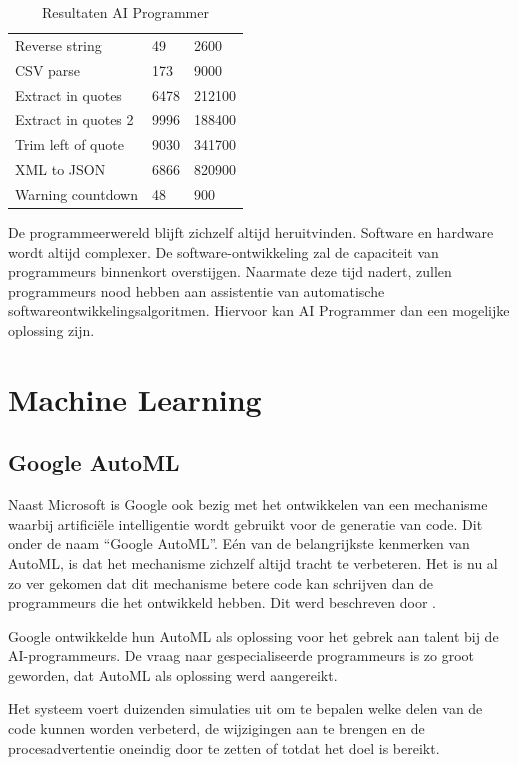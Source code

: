 \begin{table}[htb]
\begin{tabular}{lll}
		Reverse string              & 49       & 2600       \\
		CSV parse                   & 173      & 9000       \\
		Extract in quotes           & 6478     & 212100     \\
		Extract in quotes 2         & 9996     & 188400     \\
		Trim left of quote          & 9030     & 341700     \\
		XML to JSON                 & 6866     & 820900     \\
		Warning countdown           & 48       & 900       
	\end{tabular}
	\caption{Resultaten AI Programmer}
	\label{table:aiprog}
\end{table}

De programmeerwereld blijft zichzelf altijd heruitvinden. Software en hardware wordt altijd complexer. De software-ontwikkeling zal de capaciteit van programmeurs binnenkort overstijgen. Naarmate deze tijd nadert, zullen programmeurs nood hebben aan assistentie van automatische softwareontwikkelingsalgoritmen. Hiervoor kan AI Programmer dan een mogelijke oplossing zijn.

\section{Machine Learning}

\subsection{Google AutoML}

Naast Microsoft is Google ook bezig met het ontwikkelen van een mechanisme waarbij artificiële intelligentie wordt gebruikt voor de generatie van code. Dit onder de naam “Google AutoML”. Eén van de belangrijkste kenmerken van AutoML, is dat het mechanisme zichzelf altijd tracht te verbeteren. Het is nu al zo ver gekomen dat dit mechanisme betere code kan schrijven dan de programmeurs die het ontwikkeld hebben. Dit werd beschreven door \textcite{greene}.

Google ontwikkelde hun AutoML als oplossing voor het gebrek aan talent bij de AI-programmeurs. De vraag naar gespecialiseerde programmeurs is zo groot geworden, dat AutoML als oplossing werd aangereikt. 

Het systeem voert duizenden simulaties uit om te bepalen welke delen van de code kunnen worden verbeterd, de wijzigingen aan te brengen en de procesadvertentie oneindig door te zetten of totdat het doel is bereikt. 

